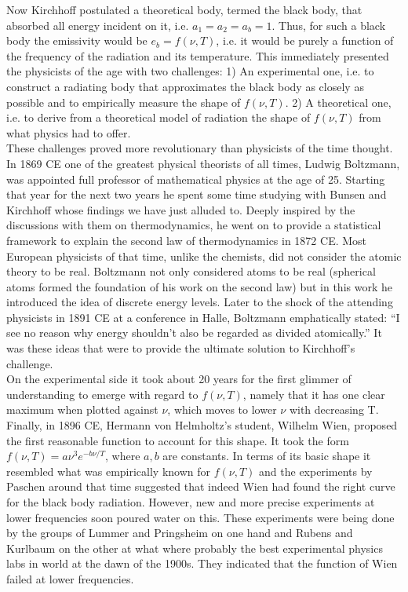 \documentclass[11pt]{article} %
\numberwithin{equation}{section}
\begin{document}
Now Kirchhoff postulated a theoretical body, termed the black body, that absorbed all energy incident on it, i.e. $a_1=a_2=a_b=1$. Thus, for such a black body the emissivity would be $e_b=f(\nu, T)$, i.e. it would be purely a function of the frequency of the radiation and its temperature. This immediately presented the physicists of the age with two challenges: 1) An experimental one, i.e. to construct a radiating body that approximates the black body as closely as possible and to empirically measure the shape of $f(\nu, T)$. 2) A theoretical one, i.e. to derive from a theoretical model of radiation the shape of $f(\nu, T)$ from what physics had to offer.\\

These challenges proved more revolutionary than physicists of the time thought. In 1869 CE one of the greatest physical theorists of all times, Ludwig Boltzmann, was appointed full professor of mathematical physics at the age of 25. Starting that year for the next two years he spent some time studying with Bunsen and Kirchhoff whose findings we have just alluded to. Deeply inspired by the discussions with them on thermodynamics, he went on to provide a statistical framework to explain the second law of thermodynamics in 1872 CE. Most European physicists of that time, unlike the chemists, did not consider the atomic theory to be real. Boltzmann not only considered atoms to be real (spherical atoms formed the foundation of his work on the second law) but in this work he introduced the idea of discrete energy levels. Later to the shock of the attending physicists in 1891 CE at a conference in Halle, Boltzmann emphatically stated: “I see no reason why energy shouldn’t also be regarded as divided atomically.” It was these ideas that were to provide the ultimate solution to Kirchhoff’s challenge.\\

On the experimental side it took about 20 years for the first glimmer of understanding to emerge with regard to $f(\nu, T)$, namely that it has one clear maximum when plotted against $\nu$, which moves to lower $\nu$ with decreasing T. Finally, in 1896 CE, Hermann von Helmholtz’s student, Wilhelm Wien, proposed the first reasonable function to account for this shape. It took the form $f(\nu, T)=a\nu^3e^{-b\nu/T}$, where $a, b$ are constants. In terms of its basic shape it resembled what was empirically known for $f(\nu, T)$ and the experiments by Paschen around that time suggested that indeed Wien had found the right curve for the black body radiation. However, new and more precise experiments at lower frequencies soon poured water on this. These experiments were being done by the groups of Lummer and Pringsheim on one hand and Rubens and Kurlbaum on the other at what where probably the best experimental physics labs in world at the dawn of the 1900s. They indicated that the function of Wien failed at lower frequencies.\\
\end{document}
